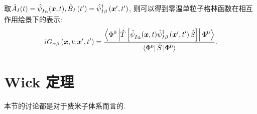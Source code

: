 取$\hat{A}_{I}(t)=\hat{\psi}^{}_{I \alpha}(\boldsymbol{x}, t), \hat{B}_{I}\left(t^{\prime}\right)=\hat{\psi}_{I \beta}^{\dagger}\left(\boldsymbol{x}^{\prime}, t^{\prime}\right)$, 则可以得到零温单粒子格林函数在相互作用绘景下的表示:
\begin{equation}\label{397}
\hspace{0.1em}\mathrm{i}\hspace{0.1em} G_{\alpha \beta}\left(\boldsymbol{x}, t ; \boldsymbol{x}^{\prime}, t^{\prime}\right)=\frac{\left\langle\Phi^{0}\left|\hat{T}\left[\hat{\psi}^{}_{I \alpha}(\boldsymbol{x}, t) \hat{\psi}_{I \beta}^{\dagger}\left(\boldsymbol{x}^{\prime}, t^{\prime}\right) \hat{S}\right]\right| \Phi^{0}\right\rangle}{\left\langle\Phi^{0}\right|\hat{S}\left| \Phi^{0}\right\rangle}.
\end{equation}

\section{Wick 定理}
本节的讨论都是对于费米子体系而言的. 

